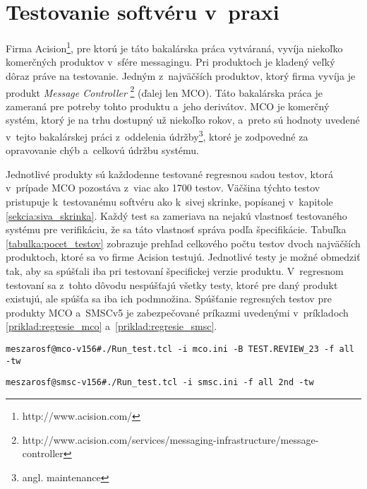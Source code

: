 \section{Testovanie softvéru v~praxi} 
\label{sekcia:testovanie_v_praxi}
Firma Acision\footnote{http://www.acision.com/}, pre ktorú je táto 
bakalárska práca vytváraná, vyvíja niekoľko komerčných produktov
v~sfére messagingu. 
Pri produktoch je kladený veľký dôraz práve na testovanie.
Jedným z~najväčších produktov, ktorý firma vyvíja je produkt 
\textit{Message Controller}
\footnote{http://www.acision.com/services/messaging-infrastructure/message-controller}
(ďalej len MCO).
Táto bakalárska práca je zameraná pre potreby tohto produktu a~jeho 
derivátov. MCO je komerčný systém, ktorý je na trhu dostupný už niekoľko 
rokov, a~preto sú hodnoty uvedené v~tejto bakalárskej práci z~oddelenia 
údržby\footnote{angl. maintenance}, ktoré je zodpovedné za opravovanie 
chýb a~celkovú údržbu systému.

Jednotlivé produkty sú každodenne testované regresnou 
sadou testov, ktorá v~prípade MCO pozostáva z~viac ako 1700 testov.
Väčšina týchto testov pristupuje k~testovanému softvéru ako k~sivej 
skrinke, popísanej v~kapitole \ref{sekcia:siva_skrinka}.
Každý test sa zameriava na nejakú vlastnosť testovaného systému pre 
verifikáciu, že sa táto vlastnosť správa podľa špecifikácie.
Tabuľka \ref{tabulka:pocet_testov} zobrazuje prehľad celkového počtu 
testov dvoch najväčších produktoch, ktoré sa vo firme Acision testujú.
Jednotlivé testy je možné obmedziť tak, aby sa spúšťali iba pri testovaní
špecifickej verzie produktu. 
V~regresnom testovaní sa z~tohto dôvodu nespúšťajú všetky testy, 
ktoré pre daný produkt existujú, ale spúšťa sa iba ich podmnožina.
Spúšťanie regresných testov pre produkty MCO a~SMSCv5 je zabezpečované 
príkazmi uvedenými v~príkladoch \ref{priklad:regresie_mco}
a~\ref{priklad:regresie_smsc}.

\begin{lstlisting}[caption=Spúšťanie regresných testov v~produkte MCO
,label=priklad:regresie_mco]
meszarosf@mco-v156#./Run_test.tcl -i mco.ini -B TEST.REVIEW_23 -f all -tw
\end{lstlisting}

\begin{lstlisting}[caption=Spúšťanie regresných testov v~produkte SMSCv5
,label=priklad:regresie_smsc]
meszarosf@smsc-v156#./Run_test.tcl -i smsc.ini -f all 2nd -tw
\end{lstlisting}


